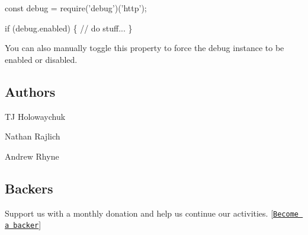 \begin{DoxyCode}
const debug = require('debug')('http');

if (debug.enabled) \{
  // do stuff...
\}
\end{DoxyCode}


You can also manually toggle this property to force the debug instance to be enabled or disabled.

\subsection*{Authors}


\begin{DoxyItemize}
\item TJ Holowaychuk
\item Nathan Rajlich
\item Andrew Rhyne
\end{DoxyItemize}

\subsection*{Backers}

Support us with a monthly donation and help us continue our activities. \mbox{[}\href{https://opencollective.com/debug#backer}{\tt Become a backer}\mbox{]}

\href{https://opencollective.com/debug/backer/0/website}{\tt } \href{https://opencollective.com/debug/backer/1/website}{\tt } \href{https://opencollective.com/debug/backer/2/website}{\tt } \href{https://opencollective.com/debug/backer/3/website}{\tt } \href{https://opencollective.com/debug/backer/4/website}{\tt } \href{https://opencollective.com/debug/backer/5/website}{\tt } \href{https://opencollective.com/debug/backer/6/website}{\tt } \href{https://opencollective.com/debug/backer/7/website}{\tt } \href{https://opencollective.com/debug/backer/8/website}{\tt } \href{https://opencollective.com/debug/backer/9/website}{\tt } \href{https://opencollective.com/debug/backer/10/website}{\tt } \href{https://opencollective.com/debug/backer/11/website}{\tt } \href{https://opencollective.com/debug/backer/12/website}{\tt } \href{https://opencollective.com/debug/backer/13/website}{\tt } \href{https://opencollective.com/debug/backer/14/website}{\tt } \href{https://opencollective.com/debug/backer/15/website}{\tt } \href{https://opencollective.com/debug/backer/16/website}{\tt } \href{https://opencollective.com/debug/backer/17/website}{\tt } \href{https://opencollective.com/debug/backer/18/website}{\tt } \href{https://opencollective.com/debug/backer/19/website}{\tt } \href{https://opencollective.com/debug/backer/20/website}{\tt } \href{https://opencollective.com/debug/backer/21/website}{\tt } \href{https://opencollective.com/debug/backer/22/website}{\tt } \href{https://opencollective.com/debug/backer/23/website}{\tt } \href{https://opencollective.com/debug/backer/24/website}{\tt } \href{https://opencollective.com/debug/backer/25/website}{\tt } \href{https://opencollective.com/debug/backer/26/website}{\tt } \href{https://opencollective.com/debug/backer/27/website}{\tt } \href{https://opencollective.com/debug/backer/28/website}{\tt } \href{https://opencollective.com/debug/backer/29/website}{\tt }

